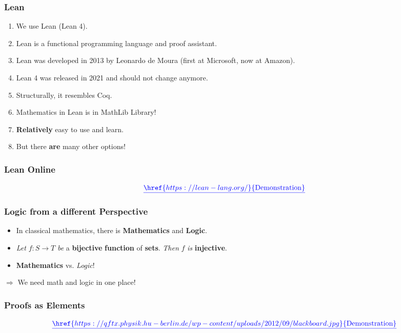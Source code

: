 \documentclass{beamer}
\theoremstyle{definition}
\theoremstyle{remark}
\begin{document}
\begin{frame}
	\frametitle{Lean}
		\begin{enumerate}
			\item We use Lean (Lean 4).
			\item Lean is a functional programming language and proof assistant.
			\item Lean was developed in 2013 by Leonardo de Moura (first at Microsoft, now at Amazon).
			\item Lean 4 was released in 2021 and should not change anymore.
			\item Structurally, it resembles Coq. 
			\item Mathematics in Lean is in MathLib Library! 
			\item \textbf{Relatively} easy to use and learn.
			\item But there \textbf{are} many other options!
		\end{enumerate}
\end{frame}

\begin{frame}
	\frametitle{Lean Online}
	
	\[
		{\color{blue}\underline{\href{https://lean-lang.org/}{\text{Demonstration}}}}
	\]
\end{frame}
\begin{frame}
	\frametitle{Logic from a different Perspective}
	\begin{itemize}
		\item In classical mathematics, there is \textbf{Mathematics} and \textbf{Logic}.
		\item \emph{Let} $f\colon S \to T$ \emph{be} a \textbf{bijective} \textbf{function} of \textbf{sets}. \emph{Then} $f$ \emph{is} \textbf{injective}. 
		\item \textbf{Mathematics} vs. \emph{Logic}! \vspace{1cm}
	\end{itemize}
 $\Rightarrow$ We need math and logic in one place!
\end{frame}

\begin{frame}
	\frametitle{Proofs as Elements}
	\[
		{\color{blue}\underline{\href{https://qftx.physik.hu-berlin.de/wp-content/uploads/2012/09/blackboard.jpg}{\text{Demonstration}}}}
	\]
\end{frame}
\end{document}
